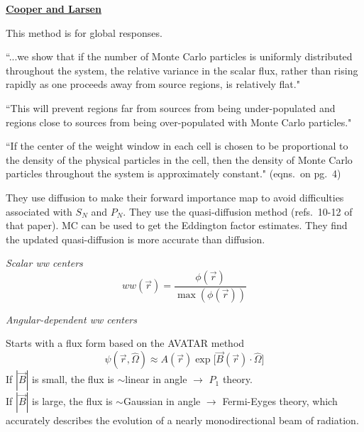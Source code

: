 \documentclass[12pt,twoside]{article}
\newcommand{\vOmega}{\ensuremath{\hat{\Omega}}}
\begin{document}
\vspace*{3em}
\begin{center}
\underline{\textbf{Cooper and Larsen}} \cite{Cooper2001}
\end{center}

This method is for global responses.

``...we show that if the number of Monte Carlo particles is uniformly distributed throughout the system, the relative variance in the scalar flux, rather than rising rapidly as one proceeds away from source regions, is relatively flat." 

``This will prevent regions far from sources from being under-populated and regions close to sources from being over-populated with Monte Carlo particles."

``If the center of the weight window in each cell is chosen to be proportional to the density of the physical particles in the cell, then the density of Monte Carlo particles throughout the system is approximately constant." (eqns.\ on pg.\ 4)

They use diffusion to make their forward importance map to avoid difficulties associated with $S_N$ and $P_N$. They use the quasi-diffusion method (refs.\ 10-12 of that paper). MC can be used to get the Eddington factor estimates. They find the updated quasi-diffusion is more accurate than diffusion. 

\vspace*{1em}
\noindent \textit{Scalar ww centers}
\begin{equation}
  ww(\vec{r}) = \frac{\phi(\vec{r})}{\max(\phi(\vec{r}))}
\end{equation}

\noindent \textit{Angular-dependent ww centers}

\noindent Starts with a flux form based on the AVATAR method
\begin{equation}
  \psi(\vec{r}, \vOmega) \approx A(\vec{r}) \exp\bigl[ \vec{B}(\vec{r}) \cdot \vOmega \bigr]
  \label{eq:avatar}
\end{equation}
If $|\vec{B}|$ is small, the flux is $\sim$linear in angle $\rightarrow$ $P_1$ theory.\\
If $|\vec{B}|$ is large, the flux is $\sim$Gaussian in angle $\rightarrow$ Fermi-Eyges theory, which accurately describes the evolution of a nearly monodirectional beam of radiation. 
\end{document}
